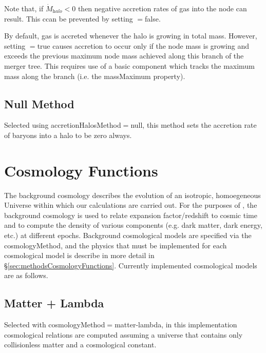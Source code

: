 Note that, if $\dot{M}_{\mathrm halo} < 0$ then negative accretion rates of gas into the node can result. This ccan be prevented by setting {\normalfont \ttfamily [accretionHalosSimpleNegativeAccretionAllowed]}$=${\normalfont \ttfamily false}.

By default, gas is accreted whenever the halo is growing in total mass. However, setting {\normalfont \ttfamily [accretionHalosSimpleAccreteNewGrowthOnly]}$=${\normalfont \ttfamily true} causes accretion to occur only if the node mass is growing and exceeds the previous maximum node mass achieved along this branch of the merger tree. This requires use of a basic component which tracks the maximum mass along the branch (i.e. the {\normalfont \ttfamily massMaximum} property).

\subsection{Null Method}

Selected using {\normalfont \ttfamily accretionHalosMethod}$=${\normalfont \ttfamily null}, this method sets the accretion rate of baryons into a halo to be zero always.

\section{Cosmology Functions}

The background cosmology describes the evolution of an isotropic, homoegeneous Universe within which our calculations are carried out. For the purposes of \glc, the background cosmology is used to relate expansion factor/redshift to cosmic time and to compute the density of various components (e.g. dark matter, dark energy, etc.) at different epochs. Background cosmological models are specified via the {\normalfont \ttfamily cosmologyMethod}, and the physics that must be implemented for each cosmological model is describe in more detail in \S\ref{sec:methodsCosmologyFunctions}. Currently implemented cosmological models are as follows.

\subsection{Matter + Lambda}\label{phys:cosmologyFunctions:cosmologyFunctionsMatterLambda}

Selected with {\normalfont \ttfamily cosmologyMethod}$=${\normalfont \ttfamily matter-lambda}, in this implementation cosmological relations are computed assuming a universe that contains only collisionless matter and a cosmological constant.

